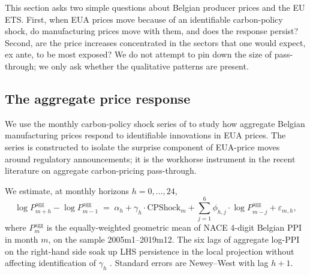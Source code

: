 %
%

This section asks two simple questions about Belgian producer prices and the EU ETS. First, when EUA prices move because of an identifiable carbon-policy shock, do manufacturing prices move with them, and does the response persist? Second, are the price increases concentrated in the sectors that one would expect, ex ante, to be most exposed? We do not attempt to pin down the size of pass-through; we only ask whether the qualitative patterns are present.

\subsection{The aggregate price response}\label{sec:passthrough_aggregate}

We use the monthly carbon-policy shock series of \citet{kanzig2023unequal} to study how aggregate Belgian manufacturing prices respond to identifiable innovations in EUA prices. The series is constructed to isolate the surprise component of EUA-price moves around regulatory announcements; it is the workhorse instrument in the recent literature on aggregate carbon-pricing pass-through.

We estimate, at monthly horizons $h = 0, \dots, 24$,
\begin{equation}
    \log P^{\text{agg}}_{m+h} - \log P^{\text{agg}}_{m-1} \;=\; \alpha_h + \gamma_h \cdot \text{CPShock}_m + \sum_{j=1}^{6} \phi_{h,j} \cdot \log P^{\text{agg}}_{m-j} + \varepsilon_{m, h},
    \label{eq:passthrough_aggregate}
\end{equation}
where $P^{\text{agg}}_m$ is the equally-weighted geometric mean of NACE 4-digit Belgian PPI in month $m$, on the sample 2005m1--2019m12. The six lags of aggregate log-PPI on the right-hand side soak up LHS persistence in the local projection without affecting identification of $\gamma_h$ \citep[][Plagborg-M\o ller--Wolf augmentation]{oleaplagborgmoller2019}. Standard errors are Newey--West with lag $h+1$.

